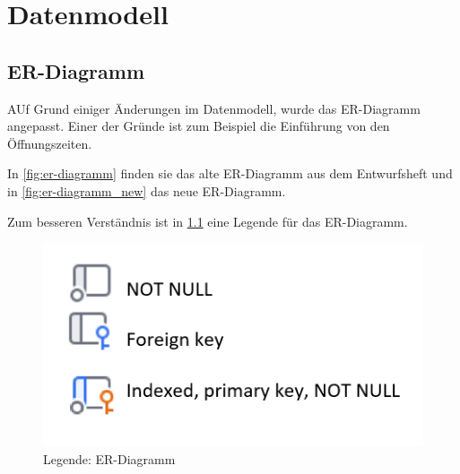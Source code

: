 
\chapter{Datenmodell}
\label{ch:datamodel}



\section{ER-Diagramm}

AUf Grund einiger Änderungen im Datenmodell, wurde das ER-Diagramm angepasst.
Einer der Gründe ist zum Beispiel die Einführung von den Öffnungszeiten.

In \ref{fig:er-diagramm} finden sie das alte ER-Diagramm aus dem Entwurfsheft und in \ref{fig:er-diagramm_new} das neue ER-Diagramm.

Zum besseren Verständnis ist in \ref{fig:er-diagramm_legend} eine Legende für das ER-Diagramm.

\begin{figure}[ht]
    \centering
    \includegraphics[width=\textwidth]{figures/ERLegend}
    \caption{Legende: ER-Diagramm}
    \label{fig:er-diagramm_legend}
\end{figure}

